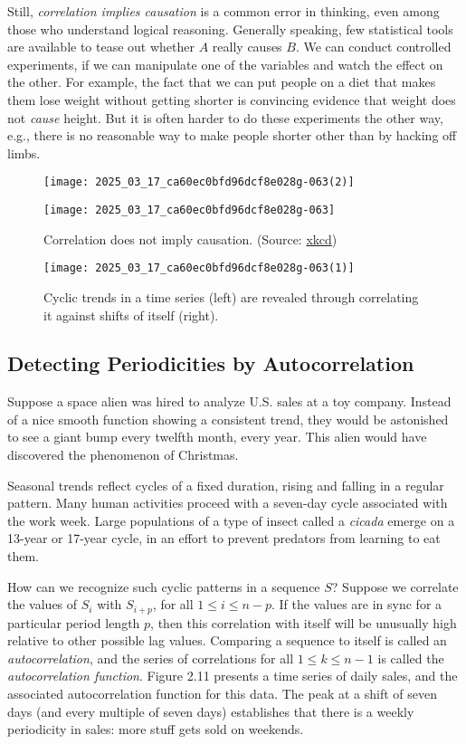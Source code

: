 \documentclass[10pt]{article}
\begin{document}
Still, \textit{correlation implies causation} is a common error in thinking, even among those who understand logical reasoning. Generally speaking, few statistical tools are available to tease out whether $A$ really causes $B$. We can conduct controlled experiments, if we can manipulate one of the variables and watch the effect on the other. For example, the fact that we can put people on a diet that makes them lose weight without getting shorter is convincing evidence that weight does not \textit{cause} height. But it is often harder to do these experiments the other way, e.g., there is no reasonable way to make people shorter other than by hacking off limbs.

\begin{figure}[ht]
\centering
\texttt{[image: 2025\_03\_17\_ca60ec0bfd96dcf8e028g-063(2)]}

\texttt{[image: 2025\_03\_17\_ca60ec0bfd96dcf8e028g-063]}
\caption{Correlation does not imply causation. (Source: \href{https://www.xkcd.com/552}{xkcd})}
\end{figure}

\begin{figure}[ht]
\centering
\texttt{[image: 2025\_03\_17\_ca60ec0bfd96dcf8e028g-063(1)]}
\caption{Cyclic trends in a time series (left) are revealed through correlating it against shifts of itself (right).}
\end{figure}

\subsection{Detecting Periodicities by Autocorrelation}
Suppose a space alien was hired to analyze U.S. sales at a toy company. Instead of a nice smooth function showing a consistent trend, they would be astonished to see a giant bump every twelfth month, every year. This alien would have discovered the phenomenon of Christmas.

Seasonal trends reflect cycles of a fixed duration, rising and falling in a regular pattern. Many human activities proceed with a seven-day cycle associated with the work week. Large populations of a type of insect called a \textit{cicada} emerge on a 13-year or 17-year cycle, in an effort to prevent predators from learning to eat them.

How can we recognize such cyclic patterns in a sequence $S$? Suppose we correlate the values of $S_{i}$ with $S_{i+p}$, for all $1 \leq i \leq n-p$. If the values are in sync for a particular period length $p$, then this correlation with itself will be unusually high relative to other possible lag values. Comparing a sequence to itself is called an \textit{autocorrelation}, and the series of correlations for all $1 \leq k \leq n-1$ is called the \textit{autocorrelation function}. Figure 2.11 presents a time series of daily sales, and the associated autocorrelation function for this data. The peak at a shift of seven days (and every multiple of seven days) establishes that there is a weekly periodicity in sales: more stuff gets sold on weekends.
\end{document}
